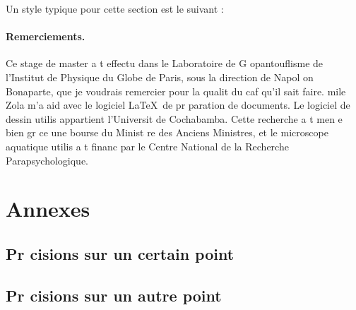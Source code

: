 \documentclass{article}
\begin{document}
Un style typique pour cette section est le suivant :

\paragraph*{Remerciements.} Ce stage de master a  t  effectu  dans le 
Laboratoire de G o\-pan\-tou\-flis\-me de 
l'Institut de Physique du Globe de Paris, sous la direction de Napol on Bonaparte, 
que je voudrais remercier pour la qualit  du caf  qu'il sait faire. 
 mile Zola m'a aid  avec le logiciel \LaTeX \ de pr paration de documents. 
Le logiciel de dessin utilis  appartient   l'Universit  de Cochabamba.
Cette recherche a  t  men e   bien gr ce   une bourse du 
Minist re des Anciens Ministres, et le microscope aquatique utilis  a 
 t  financ  par le Centre National de la Recherche Parapsychologique. 
 
\newpage


            
\newpage


\section{Annexes}
 
\subsection{Pr cisions sur un certain point}
  
\subsection{Pr cisions sur un autre point}
\end{document}
